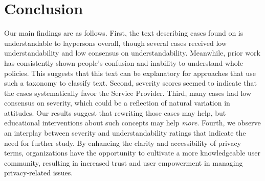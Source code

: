 \section{Conclusion
}

Our main findings are as follows.
First, the text describing cases found on \tosdr{} is understandable to laypersons overall, though several cases received low understandability and low consensus on understandability.
Meanwhile, prior work has consistently shown people's confusion and inability to understand whole policies.
This suggests that this text can be explanatory for approaches that use such a taxonomy to classify text.
Second, severity scores seemed to indicate that the cases systematically favor the Service Provider.
Third, many cases had low consensus on severity, which could be a reflection of natural variation in attitudes.
Our results suggest that rewriting those cases may help, but educational interventions about such concepts may help \textit{more}.
Fourth, we observe an interplay between severity and understandability ratings that indicate the need for further study.
By enhancing the clarity and accessibility of privacy terms, organizations have the opportunity to cultivate a more knowledgeable user community, resulting in increased trust and user empowerment in managing privacy-related issues.

 